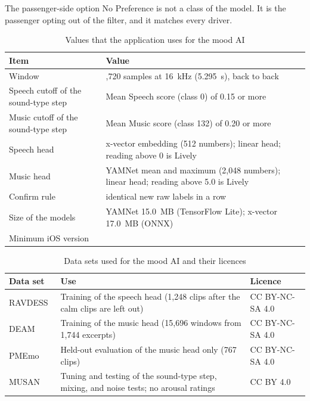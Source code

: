 The passenger-side option No Preference is not a class of the model. It is the passenger opting out of the filter, and it matches every driver.

\begin{table}[htbp]
    \centering
    \caption{Values that the application uses for the mood AI}\label{tab:ai-values}
    \small
    \renewcommand{\arraystretch}{1.2}
    \begin{tabular}{|>{\raggedright\arraybackslash}p{}|>{\raggedright\arraybackslash}p{}|}
        \hline
        \textbf{Item} & \textbf{Value} \\
        \hline
        Window & 84,720 samples at 16~kHz (5.295~s), back to back \\
        \hline
        Speech cutoff of the sound-type step & Mean Speech score (class 0) of 0.15 or more \\
        \hline
        Music cutoff of the sound-type step & Mean Music score (class 132) of 0.20 or more \\
        \hline
        Speech head & x-vector embedding (512 numbers); linear head; reading above 0 is Lively \\
        \hline
        Music head & YAMNet mean and maximum (2,048 numbers); linear head; reading above 5.0 is Lively \\
        \hline
        Confirm rule & 2 identical new raw labels in a row \\
        \hline
        Size of the models & YAMNet 15.0~MB (TensorFlow Lite); x-vector 17.0~MB (ONNX) \\
        \hline
        Minimum iOS version & 16 \\
        \hline
    \end{tabular}
\end{table}

\begin{table}[htbp]
    \centering
    \caption{Data sets used for the mood AI and their licences}\label{tab:ai-datasets}
    \small
    \renewcommand{\arraystretch}{1.2}
    \begin{tabular}{|>{\raggedright\arraybackslash}p{}|>{\raggedright\arraybackslash}p{}|>{\raggedright\arraybackslash}p{}|}
        \hline
        \textbf{Data set} & \textbf{Use} & \textbf{Licence} \\
        \hline
        RAVDESS~\cite{livingstone2018ravdess} & Training of the speech head (1,248 clips after the calm clips are left out) & CC BY-NC-SA 4.0 \\
        \hline
        DEAM~\cite{aljanaki2017deam} & Training of the music head (15,696 windows from 1,744 excerpts) & CC BY-NC-SA 4.0 \\
        \hline
        PMEmo~\cite{zhang2018pmemo} & Held-out evaluation of the music head only (767 clips) & CC BY-NC-SA 4.0 \\
        \hline
        MUSAN~\cite{snyder2015musan} & Tuning and testing of the sound-type step, mixing, and noise tests; no arousal ratings & CC BY 4.0 \\
        \hline
    \end{tabular}
\end{table}

